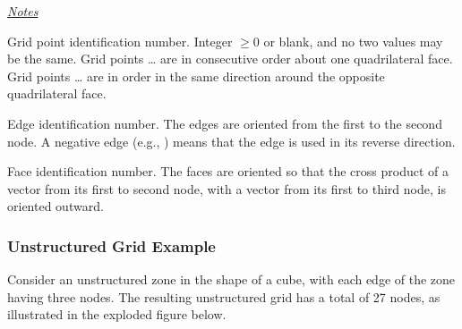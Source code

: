 {{{\medskip

\uline{\textit{Notes}}

\begin{Ventryi}{}
   \item [\fort{N1,\ldots,N64}]
         Grid point identification number.
         Integer $\ge 0$ or blank, and no two values may be the same.
         Grid points \ldots{} are in consecutive order about
         one quadrilateral face.
         Grid points \ldots{} are in order in the same
         direction around the opposite quadrilateral face.
   \item [\fort{E1,\ldots,E12}]
         Edge identification number.
         The edges are oriented from the first to the second node.
         A negative edge (e.g., ) means that the edge is used in
         its reverse direction.
   \item [\fort{F1,\ldots,F6}]
         Face identification number.
         The faces are oriented so that the cross product of a vector
         from its first to second node, with a vector from its first to
         third node, is oriented outward.
\end{Ventryi}

\subsubsection{Unstructured Grid Example}
\label{s:unst_example}

Consider an unstructured zone in the shape of a cube, with each edge
of the zone having three nodes.
The resulting unstructured grid has a total of 27 nodes, as illustrated
in the exploded figure below.

}}}
